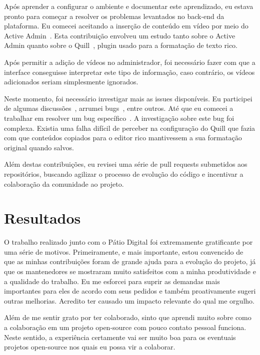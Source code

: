 \documentclass[a4paper, 11pt]{article} %
\begin{document}
Após aprender a configurar o ambiente e documentar este aprendizado, eu estava pronto para começar a resolver os problemas levantados no back-end da plataforma. Eu comecei aceitando a inserção de conteúdo em vídeo por meio do Active Admin~\cite{PC_I20}. Esta contribuição envolveu um estudo tanto sobre o Active Admin quanto sobre o Quill~\cite{Quill}, plugin usado para a formatação de texto rico.

Após permitir a adição de vídeos no administrador, foi necessário fazer com que a interface conseguisse interpretar este tipo de informação, caso contrário, os vídeos adicionados seriam simplesmente ignorados.

Neste momento, foi necessário investigar mais as issues disponíveis. Eu participei de algumas discussões~\cite{PC_I15}, arrumei bugs~\cite{PCA_P52}, entre outros. Até que eu comecei a trabalhar em resolver um bug específico~\cite{PC_I4}. A investigação sobre este bug foi complexa. Existia uma falha difícil de perceber na configuração do Quill que fazia com que conteúdos copiados para o editor rico mantivessem a sua formatação original quando salvos. 

Além destas contribuições, eu revisei uma série de pull requests submetidos aos repositórios, buscando agilizar o processo de evolução do código e incentivar a colaboração da comunidade ao projeto. 


\section*{Resultados}

O trabalho realizado junto com o Pátio Digital foi extremamente gratificante por uma série de motivos. Primeiramente, e mais importante, estou convencido de que as minhas contribuições foram de grande ajuda para a evolução do projeto, já que os mantenedores se mostraram muito satisfeitos com a minha produtividade e a qualidade do trabalho. Eu me esforcei para suprir as demandas mais importantes para eles de acordo com seus pedidos e também proativamente sugeri outras melhorias. Acredito ter causado um impacto relevante do qual me orgulho.

Além de me sentir grato por ter colaborado, sinto que aprendi muito sobre como a colaboração em um projeto open-source com pouco contato pessoal funciona. Neste sentido, a experiência certamente vai ser muito boa para os eventuais projetos open-source nos quais eu possa vir a colaborar.
\end{document}
